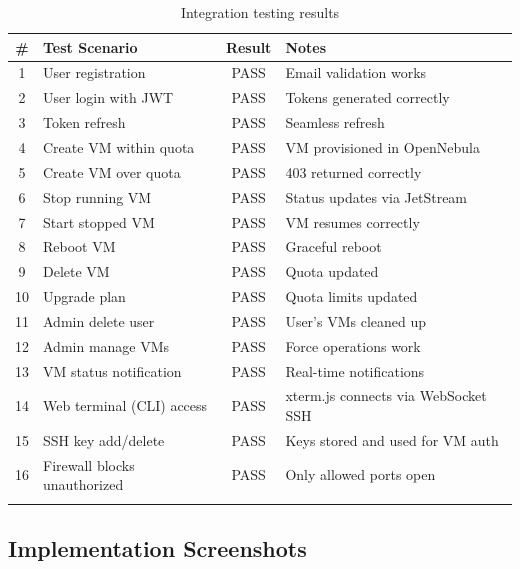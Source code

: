 \begin{longtable}{|c|p{5cm}|c|p{3cm}|}
\hline
\rowcolor{blue!15}
\textbf{\#} & \textbf{Test Scenario} & \textbf{Result} & \textbf{Notes} \\
\hline
\endhead
1 & User registration & \textcolor{green!70!black}{PASS} & Email validation works \\
\hline
2 & User login with JWT & \textcolor{green!70!black}{PASS} & Tokens generated correctly \\
\hline
3 & Token refresh & \textcolor{green!70!black}{PASS} & Seamless refresh \\
\hline
4 & Create VM within quota & \textcolor{green!70!black}{PASS} & VM provisioned in OpenNebula \\
\hline
5 & Create VM over quota & \textcolor{green!70!black}{PASS} & 403 returned correctly \\
\hline
6 & Stop running VM & \textcolor{green!70!black}{PASS} & Status updates via JetStream \\
\hline
7 & Start stopped VM & \textcolor{green!70!black}{PASS} & VM resumes correctly \\
\hline
8 & Reboot VM & \textcolor{green!70!black}{PASS} & Graceful reboot \\
\hline
9 & Delete VM & \textcolor{green!70!black}{PASS} & Quota updated \\
\hline
10 & Upgrade plan & \textcolor{green!70!black}{PASS} & Quota limits updated \\
\hline
11 & Admin delete user & \textcolor{green!70!black}{PASS} & User's VMs cleaned up \\
\hline
12 & Admin manage VMs & \textcolor{green!70!black}{PASS} & Force operations work \\
\hline
13 & VM status notification & \textcolor{green!70!black}{PASS} & Real-time notifications \\
\hline
14 & Web terminal (CLI) access & \textcolor{green!70!black}{PASS} & xterm.js connects via WebSocket SSH \\
\hline
15 & SSH key add/delete & \textcolor{green!70!black}{PASS} & Keys stored and used for VM auth \\
\hline
16 & Firewall blocks unauthorized & \textcolor{green!70!black}{PASS} & Only allowed ports open \\
\hline
\caption{Integration testing results}
\label{tab:test-results}
\end{longtable}

\subsection{Implementation Screenshots}

